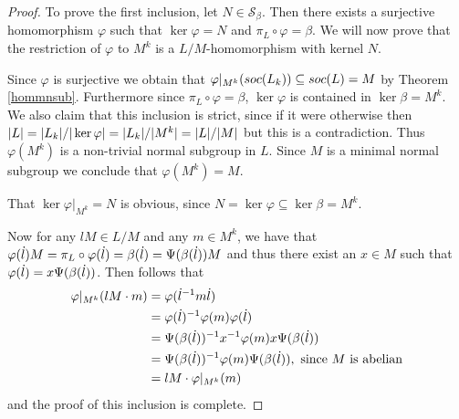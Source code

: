 \begin{proof}
    To prove the first inclusion, let $N \in \mathscr{S}_\beta$. Then there exists a surjective homomorphism $\varphi$ such that $\ker \varphi = N$ and $\pi_L \circ \varphi = \beta$. We will now prove that the restriction of $\varphi$ to $M^k$ is a $L/M$-homomorphism with kernel $N$.


    Since $\varphi$ is surjective we obtain that $\varphi|_{M^k}(soc {(L_k)}) \subseteq soc {(L)} = M$ by Theorem \ref{hommnsub}. 
    Furthermore since $\pi_L \circ \varphi = \beta$, $\ker \varphi$ is contained in $\ker \beta = M^k$. 
    We also claim that this inclusion is strict, since if it were otherwise then $| L | = | L_k |/| \ker \varphi | = | L_k |/| M^k | = | L |/| M |$ but this is a contradiction. 
    Thus $\varphi(M^k)$ is a non-trivial normal subgroup in $L$. Since $M$ is a minimal normal subgroup we conclude that $\varphi(M^k) = M$.

    That $\ker \varphi|_{M^k} = N$ is obvious, since $N = \ker \varphi \subseteq \ker \beta = M^k$.

    Now for any $lM \in L/M$ and any $m \in M^k$, we have that $\varphi(\dot{l})M = \pi_L \circ \varphi(\dot{l}) = \beta(\dot{l}) = \Psi(\beta(\dot{l}))M$ and thus there exist an $x \in M$ such that $\varphi(\dot{l}) = x\Psi(\beta(\dot{l}))$.
    Then follows that
    \begin{align*}
        \varphi|_{M^k}(lM \cdot m) &= \varphi(\dot{l}^{-1} m \dot{l}) \\
                                    &= \varphi(\dot{l})^{-1} \varphi(m) \varphi(\dot{l}) \\
                                    &= \Psi(\beta(\dot{l}))^{-1}x^{-1} \varphi(m) x\Psi(\beta(\dot{l})) \\
                                    &= \Psi(\beta(\dot{l}))^{-1} \varphi(m) \Psi(\beta(\dot{l})), \text{ since $M$ is abelian} \\
                                    &= lM \cdot \varphi|_{M^k}(m) 
    \end{align*}
    and the proof of this inclusion is complete.


\end{proof}
